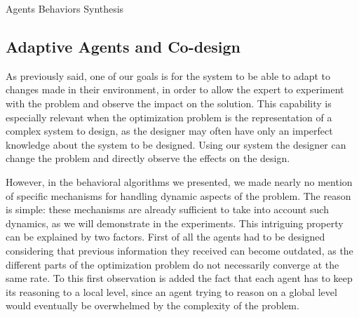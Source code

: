 \begin{algorithm}
\caption{Agents Behaviors Synthesis}\label{agent_algo}






\end{algorithm}

\subsection{Adaptive Agents and Co-design}

As previously said, one of our goals is for the system to be able to adapt to changes made in their environment, in order to allow the expert to experiment with the problem and observe the impact on the solution. This capability is especially relevant when the optimization problem is the representation of a complex system to design, as the designer may often have only an imperfect knowledge about the system to be designed. Using our system the designer can change the problem and directly observe the effects on the design.

However, in the behavioral algorithms we presented, we made nearly no mention of specific mechanisms for handling dynamic aspects of the problem. The reason is simple: these mechanisms are already sufficient to take into account such dynamics, as we will demonstrate in the experiments. This intriguing property can be explained by two factors. First of all the agents had to be designed considering that previous information they received can become outdated, as the different parts of the optimization problem do not necessarily converge at the same rate. To this first observation is added the fact that each agent has to keep its reasoning to a local level, since an agent trying to reason on a global level would eventually be overwhelmed by the complexity of the problem. 

